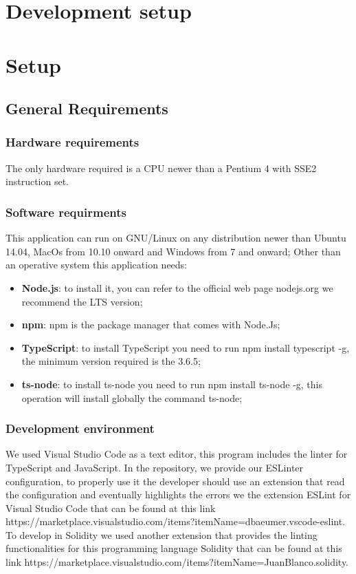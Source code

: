 \section{Development setup}
\section{Setup}
\subsection{General Requirements}
\subsubsection{Hardware requirements}
The only hardware required is a CPU newer than a Pentium 4 with SSE2 instruction set.
\subsubsection{Software requirments}
This application can run on GNU/Linux on any distribution newer than Ubuntu 14.04, MacOs from 10.10 onward and Windows from 7 and onward;
Other than an operative system this application needs:
\begin{itemize}
    \item \textbf{Node.js}: to install it, you can refer to the official web page nodejs.org we recommend the LTS version;
    \item \textbf{npm}: npm is the package manager that comes with Node.Js;
    \item \textbf{TypeScript}: to install TypeScript you need to run npm install typescript -g, the minimum version required is the 3.6.5;
    \item \textbf{ts-node}: to install ts-node you need to run npm install ts-node -g, this operation will install globally the command ts-node;
\end{itemize}
\subsubsection{Development environment}
We used Visual Studio Code as a text editor, this program includes the linter for TypeScript and JavaScript.
In the repository, we provide our ESLinter configuration, 
to properly use it the developer should use an extension that read the configuration and eventually highlights the errors we the extension ESLint
for Visual Studio Code that can be found at this link https://marketplace.visualstudio.com/items?itemName=dbaeumer.vscode-eslint.
To develop in Solidity we used another extension that provides the linting functionalities for this programming language Solidity that can be found
at this link https://marketplace.visualstudio.com/items?itemName=JuanBlanco.solidity.

